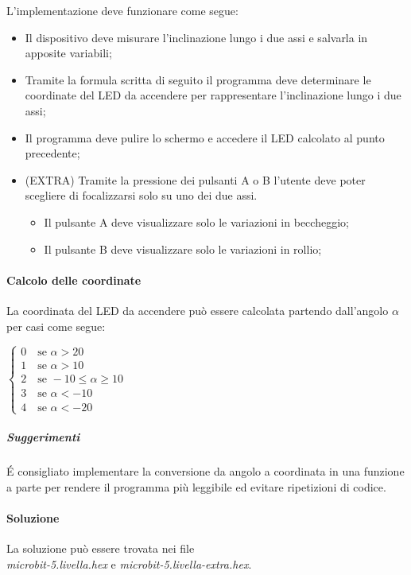 \documentclass[../../docenti.tex]{subfiles}
\begin{document}
L'implementazione deve funzionare come segue:
\begin{itemize}
	\item Il dispositivo deve misurare l'inclinazione lungo i due assi e salvarla in apposite variabili;
	\item Tramite la formula scritta di seguito il programma deve determinare le coordinate del LED da accendere per rappresentare l'inclinazione lungo i due assi;
	\item Il programma deve pulire lo schermo e accedere il LED calcolato al punto precedente;
	\item (EXTRA) Tramite la pressione dei pulsanti A o B l'utente deve poter scegliere di focalizzarsi solo su uno dei due assi.
	\begin{itemize}
		\item Il pulsante A deve visualizzare solo le variazioni in beccheggio;
		\item Il pulsante B deve visualizzare solo le variazioni in rollio;
	\end{itemize}
\end{itemize}

\paragraph{Calcolo delle coordinate}
La coordinata del LED da accendere può essere calcolata partendo dall'angolo \(\alpha\) per casi come segue:
\begin{center}
	\begin{math}
		\begin{cases}
			0\quad\text{se } \alpha > 20\\
			1\quad\text{se } \alpha > 10\\
			2\quad\text{se } -10 \leq \alpha \geq 10\\
			3\quad\text{se } \alpha < -10\\
			4\quad\text{se } \alpha < -20
		\end{cases}
	\end{math}
\end{center}

\subparagraph{Suggerimenti}
É consigliato implementare la conversione da angolo a coordinata in una funzione a parte per rendere il programma più leggibile ed evitare ripetizioni di codice.

\paragraph{Soluzione}
La soluzione può essere trovata nei file\\
\textit{microbit-5.livella.hex} e \textit{microbit-5.livella-extra.hex}.
\end{document}
